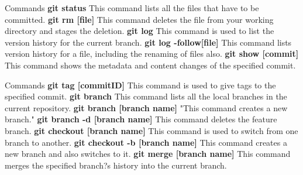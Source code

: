 \documentclass[xcolor=x11names,compress]{beamer}
\renewcommand{\(}{\begin{columns}}
\renewcommand{\)}{\end{columns}}
\newcommand{\<}[1]{\begin{column}{#1}}
\renewcommand{\>}{\end{column}}
\begin{document}
\begin{frame}{Commands}
\textbf{git status		}	\newline	This command lists all the files that have to be committed.	\newline	\newline
\textbf{git rm [file]		}	\newline	This command deletes the file from your working directory and stages the deletion.	\newline	\newline
\textbf{git log		}	\newline This command is used to list the version history for the current branch.
\newline	\newline
\textbf{git log -follow[file]}	\newline	This command lists version history for a file, including the renaming of files also.	\newline	\newline
\textbf{git show [commit]		}	\newline	This command shows the metadata and content changes of the specified commit.	\newline	\newline
	\end{frame}
	\begin{frame}{Commands}
		\textbf{ git tag [commitID]		}	\newline	This command is used to give tags to the specified commit.	\newline	\newline
		\textbf{git branch		}	\newline	This command lists all the local branches in the current repository.	\newline	\newline
		\textbf{git branch [branch name]}	\newline "This command creates a new branch."	\newline	\newline
		\textbf{git branch -d [branch name]		}	\newline	This command deletes the feature branch.	\newline	\newline
		\textbf{git checkout [branch name]		}	\newline	This command is used to switch from one branch to another.	\newline	\newline
		\textbf{git checkout -b [branch name]		}	\newline	This command creates a new branch and also switches to it.	\newline	\newline
		\textbf{git merge [branch name]		}	\newline	This command merges the specified branch?s history into the current branch.	\newline	\newline
		
	\end{frame}
\end{document}
